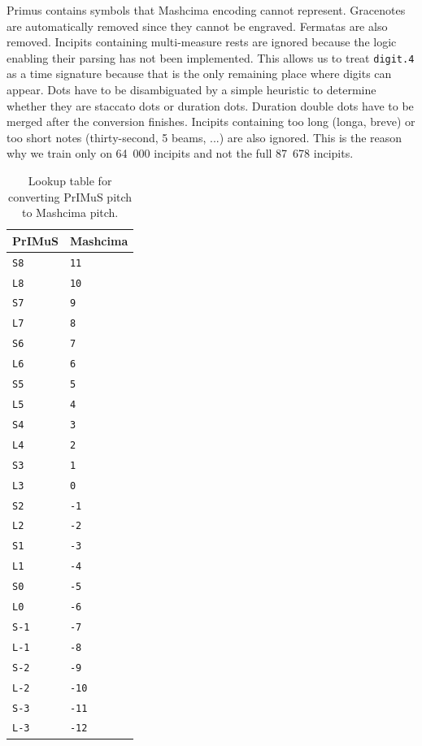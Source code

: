 Primus contains symbols that Mashcima encoding cannot represent. Gracenotes are automatically removed since they cannot be engraved. Fermatas are also removed. Incipits containing multi-measure rests are ignored because the logic enabling their parsing has not been implemented. This allows us to treat \verb`digit.4` as a time signature because that is the only remaining place where digits can appear. Dots have to be disambiguated by a simple heuristic to determine whether they are staccato dots or duration dots. Duration double dots have to be merged after the conversion finishes. Incipits containing too long (longa, breve) or too short notes (thirty-second, 5 beams, ...) are also ignored. This is the reason why we train only on 64~000 incipits and not the full 87~678 incipits.

\begin{table}[p] \centering
\begin{tabular}{ll}
\toprule
\textbf{PrIMuS} & \textbf{Mashcima} \\
\midrule
\verb`S8` & \verb`11` \\
\verb`L8` & \verb`10` \\
\verb`S7` & \verb`9` \\
\verb`L7` & \verb`8` \\
\verb`S6` & \verb`7` \\
\verb`L6` & \verb`6` \\
\verb`S5` & \verb`5` \\
\verb`L5` & \verb`4` \\
\verb`S4` & \verb`3` \\
\verb`L4` & \verb`2` \\
\verb`S3` & \verb`1` \\
\verb`L3` & \verb`0` \\
\verb`S2` & \verb`-1` \\
\verb`L2` & \verb`-2` \\
\verb`S1` & \verb`-3` \\
\verb`L1` & \verb`-4` \\
\verb`S0` & \verb`-5` \\
\verb`L0` & \verb`-6` \\
\verb`S-1` & \verb`-7` \\
\verb`L-1` & \verb`-8` \\
\verb`S-2` & \verb`-9` \\
\verb`L-2` & \verb`-10` \\
\verb`S-3` & \verb`-11` \\
\verb`L-3` & \verb`-12` \\
\bottomrule
\end{tabular}
\caption{Lookup table for converting PrIMuS pitch to Mashcima pitch.}
\label{tab4:PitchConversionLookup}
\end{table}

